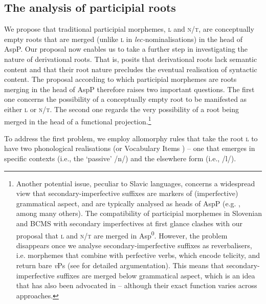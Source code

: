 \documentclass[output=paper,colorlinks,citecolor=brown]{langscibook}
\begin{document}
\subsection{The analysis of participial roots \label{sec:syntax_of_participial_morphemes}}

We propose that traditional participial morphemes,  \textsc{l} and \textsc{n/t}, are conceptually empty roots that are merged (unlike \textsc{l} in \textit{lec-}nominalisations) in the head of AspP. 
Our proposal now enables us to take a further step in investigating the nature of derivational roots. That is, \citet{lowenstamm2014} posits that derivational roots lack semantic content and that their root nature precludes the eventual realisation of syntactic content. The proposal according to which participial morphemes are roots merging in the head of AspP therefore raises two important questions. The first one concerns the possibility of a conceptually empty root to be manifested as either \textsc{l} or \textsc{n/t}. The second one regards the very possibility of a root being merged in the head of a functional projection.\footnote{Another potential issue, peculiar to Slavic languages, concerns a widespread view that secondary-imperfective suffixes are markers of (imperfective) grammatical aspect, and are typically analysed as heads of AspP (e.g. \citealt{sim+:Smith1997, sim+:Ramchand2004, Ramchand2008a, Borer.2005, sim+:Progovac2005, sim+:Borik2006}, among many others). The compatibility of participial morphemes in Slovenian and BCMS with secondary imperfectives at first glance clashes with our proposal that \textsc{l} and \textsc{n/t} are merged in Asp\textsuperscript{0}. However, the problem disappears once we analyse secondary-imperfective suffixes as reverbalisers, i.e. morphemes that combine with perfective verbs, which encode telicity, and return bare \textit{v}Ps (see %
\citealt{Arsenijević2023SLE, SimonovićArsMil2021} for detailed argumentation). This means that secondary-imperfective suffixes are merged below grammatical aspect, which is an idea that has also been advocated in \citet{Klein1995, sim+:Lazorczyk2010, tatevosov2015severing, tatevosov2017, Mueller-Reichau2020, sim+:Biskup2023, Milosavljević2023} -- although their exact function varies across approaches.} 


To address the first problem, we  employ allomorphy rules that take the root \textsc{l} to have two phonological realisations (or Vocabulary Items ) -- one that emerges in specific contexts (i.e., the `passive' /n/) and the elsewhere form (i.e., /l/).
\end{document}

